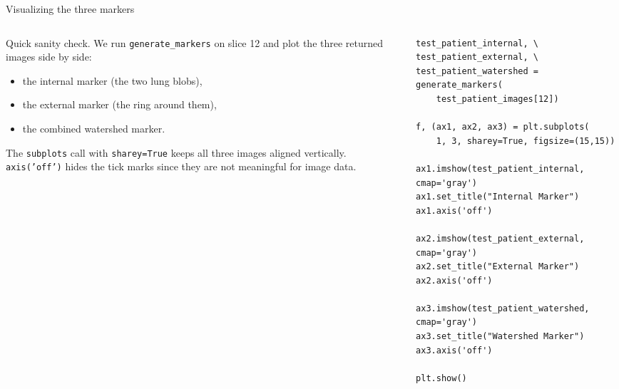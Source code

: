 \documentclass[10pt,aspectratio=169]{beamer}
\renewcommand{\section}[2][]{}
\begin{document}
\begin{frame}[fragile]{Visualizing the three markers}
\begin{columns}[T,onlytextwidth]
\begin{column}{0.42\textwidth}
\small
Quick sanity check. We run \texttt{generate\_markers} on slice 12 and plot the three returned images side by side:
\begin{itemize}
  \item the internal marker (the two lung blobs),
  \item the external marker (the ring around them),
  \item the combined watershed marker.
\end{itemize}
The \texttt{subplots} call with \texttt{sharey=True} keeps all three images aligned vertically.\\[0.4em]
\texttt{axis('off')} hides the tick marks since they are not meaningful for image data.
\end{column}
\begin{column}{0.56\textwidth}
\begin{lstlisting}[firstnumber=109]
test_patient_internal, \
test_patient_external, \
test_patient_watershed = generate_markers(
    test_patient_images[12])

f, (ax1, ax2, ax3) = plt.subplots(
    1, 3, sharey=True, figsize=(15,15))

ax1.imshow(test_patient_internal, cmap='gray')
ax1.set_title("Internal Marker")
ax1.axis('off')

ax2.imshow(test_patient_external, cmap='gray')
ax2.set_title("External Marker")
ax2.axis('off')

ax3.imshow(test_patient_watershed, cmap='gray')
ax3.set_title("Watershed Marker")
ax3.axis('off')

plt.show()
\end{lstlisting}
\end{column}
\end{columns}
\end{frame}

\section{The full segmentation pipeline}
\end{document}
